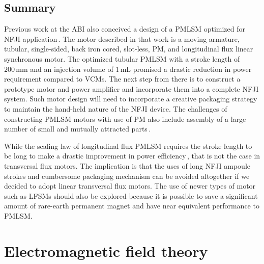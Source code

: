         
    \subsection{Summary}                         \label{Chapter:background/linear synchronous motors for NFJI/summary}
        
        
        Previous work at the ABI also conceived a design of a \ac{PMLSM} optimized for \acs{NFJI} application\,\cite{Ruddy2015}. The motor described in that work is a moving armature, tubular, single-sided, back iron cored, slot-less, \acs{PM}, and longitudinal flux linear synchronous motor. The optimized tubular \acs{PMLSM} with a stroke length of $\mathrm{200\,mm}$ and an injection volume of $\mathrm{1\,mL}$ promised a drastic reduction in power requirement compared to \acsp{VCM}. The next step from there is to construct a prototype motor and power amplifier and incorporate them into a complete \acs{NFJI} system. Such motor design will need to incorporate a creative packaging strategy to maintain the hand-held nature of the \acs{NFJI} device. The challenges of constructing \acs{PMLSM} motors with use of PM also include assembly of a large number of small and mutually attracted parts\,\cite{Hwang2012,Shin2012}.
        
        
        While the scaling law of longitudinal flux \acs{PMLSM} requires the stroke length to be long to make a drastic improvement in power efficiency\,\cite{Laithwaite1970}, that is not the case in transversal flux motors. The implication is that the uses of long \acs{NFJI} ampoule strokes and cumbersome packaging mechanism can be avoided altogether if we decided to adopt linear transversal flux motors. The use of newer types of motor such as \acsp{LFSM} should also be explored because it is possible to save a significant amount of rare-earth permanent magnet and have near equivalent performance to \acs{PMLSM}.


\section{Electromagnetic field theory}              \label{Chapter:background/electromagnetic field theory}


